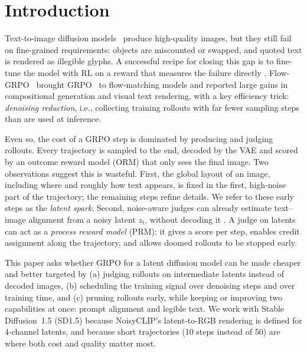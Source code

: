 \documentclass{article}
\begin{document}
\section{Introduction}
\label{sec:intro}

Text-to-image diffusion models~\citep{ho2020ddpm,rombach2022ldm} produce high-quality images, but they still fail on
fine-grained requirements: objects are miscounted or swapped, and quoted text is rendered as illegible glyphs. A successful
recipe for closing this gap is to fine-tune the model with RL on a reward that measures the failure directly
\citep{black2023ddpo,fan2023dpok}. Flow-GRPO~\citep{liu2025flowgrpo} brought GRPO~\citep{shao2024deepseekmath} to flow-matching
models and reported large gains in compositional generation and visual text rendering, with a key efficiency trick:
\emph{denoising reduction}, i.e., collecting training rollouts with far fewer sampling steps than are used at inference.

Even so, the cost of a GRPO step is dominated by producing and judging rollouts. Every trajectory is sampled to the end,
decoded by the VAE and scored by an outcome reward model (ORM) that only sees the final image. Two observations suggest this is
wasteful. First, the global layout of an image, including where and roughly how text appears, is fixed in the first, high-noise
part of the trajectory; the remaining steps refine details. We refer to these early steps as the \emph{latent spark}. Second,
noise-aware judges can already estimate text--image alignment from a noisy latent $z_t$, without decoding it
\citep{ramos2026noisyclip}. A judge on latents can act as a \emph{process reward model} (PRM): it gives a score per step,
enables credit assignment along the trajectory, and allows doomed rollouts to be stopped early.

This paper asks whether GRPO for a latent diffusion model can be made cheaper and better targeted by (a) judging rollouts on
intermediate latents instead of decoded images, (b) scheduling the training signal over denoising steps and over training
time, and (c) pruning rollouts early, while keeping or improving two capabilities at once: prompt alignment and legible text.
We work with Stable Diffusion~1.5 (SD1.5) because NoisyCLIP's latent-to-RGB rendering is defined for 4-channel latents, and
because short trajectories (10 steps instead of 50) are where both cost and quality matter most.
\end{document}

